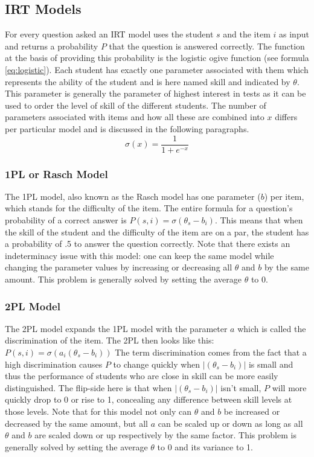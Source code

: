 \documentclass{scrartcl}
\begin{document}
\subsection{IRT Models}
For every question asked an IRT model uses the student $s$ and the item $i$ as input and returns a probability $P$ that the question is answered correctly. The function at the basis of providing this probability is the logistic ogive function (see formula \ref{eq:logistic}). Each student has exactly one parameter associated with them which represents the ability of the student and is here named skill and indicated by $\theta$. This parameter is generally the parameter of highest interest in tests as it can be used to order the level of skill of the different students. The number of parameters associated with items and how all these are combined into $x$ differs per particular model and is discussed in the following paragraphs.
\begin{equation}
\label{eq:logistic}
\sigma(x) = \frac{1}{1+e^{-x}}
\end{equation}

\subsubsection{1PL or Rasch Model}
\label{sec:1PL}
The 1PL model, also known as the Rasch model has one parameter ($b$) per item, which stands for the difficulty of the item. The entire formula for a question's probability of a correct answer is $P(s,i) = \sigma(\theta_{s} - b_{i})$. This means that when the skill of the student and the difficulty of the item are on a par, the student has a probability of .5 to answer the question correctly. Note that there exists an indeterminacy issue with this model: one can keep the same model while changing the parameter values by increasing or decreasing all $\theta$ and $b$ by the same amount. This problem is generally solved by setting the average $\theta$ to 0.

\subsubsection{2PL Model}
The 2PL model expands the 1PL model with the parameter $a$ which is called the discrimination of the item. The 2PL then looks like this: $P(s,i) = \sigma(a_{i} (\theta_{s} - b_{i}))$ The term discrimination comes from the fact that a high discrimination causes $P$ to change quickly when $|(\theta_{s} - b_{i})|$ is small and thus the performance of students who are close in skill can be more easily distinguished. The flip-side here is that when $|(\theta_{s} - b_{i})|$ isn't small, $P$ will more quickly drop to 0 or rise to 1, concealing any difference between skill levels at those levels. Note that for this model not only can $\theta$ and $b$ be increased or decreased by the same amount, but all $a$ can be scaled up or down as long as all $\theta$ and $b$ are scaled down or up respectively by the same factor. This problem is generally solved by setting the average $\theta$ to 0 and its variance to 1. 
\end{document}
